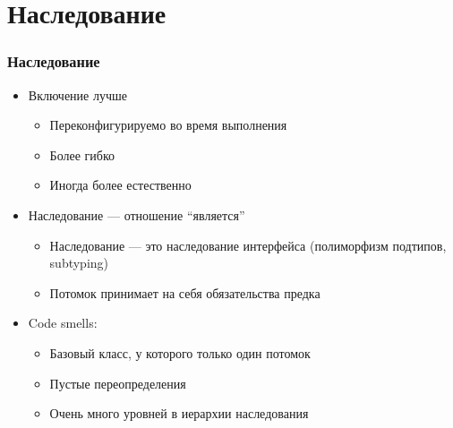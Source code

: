 \documentclass[xetex,mathserif,serif]{beamer}
\begin{document}
    \section{Наследование}

    \begin{frame}
        \frametitle{Наследование}
        \begin{itemize}
            \item Включение лучше
            \begin{itemize}
                \item Переконфигурируемо во время выполнения
                \item Более гибко
                \item Иногда более естественно
            \end{itemize}
            \item Наследование --- отношение ``является''
            \begin{itemize}
                \item Наследование --- это наследование интерфейса (полиморфизм подтипов, subtyping)
                \item Потомок принимает на себя обязательства предка
            \end{itemize}
            \item Code smells:
            \begin{itemize}
                \item Базовый класс, у которого только один потомок
                \item Пустые переопределения
                \item Очень много уровней в иерархии наследования
            \end{itemize}
        \end{itemize}
    \end{frame}
\end{document}
